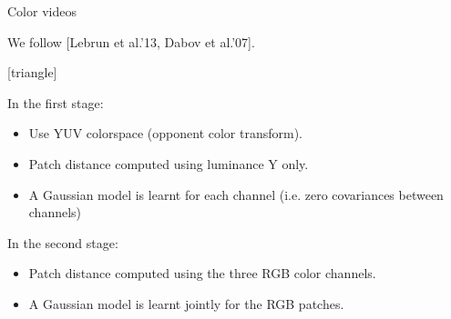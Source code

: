 \documentclass[mathserif, 8pt]{beamer}
\newcommand{\reference}[1] {{\color{gray} [#1]}}
\begin{document}
\begin{frame}{Color videos}

	We follow \reference{Lebrun et al.'13, Dabov et al.'07}.

	\bigskip

	[triangle]
	
	In the first stage: 
	\begin{itemize}\itemsep=.3cm
		\item Use YUV colorspace (opponent color transform).
		\item Patch distance computed using luminance Y only.
		\item A Gaussian model is learnt for each channel (i.e. zero covariances
			between channels)
	\end{itemize}

	\bigskip

	\bigskip

	In the second stage: 
	\begin{itemize}\itemsep=.3cm
		\item Patch distance computed using the three RGB color channels.
		\item A Gaussian model is learnt jointly for the RGB patches.
	\end{itemize}
	
\end{frame}

% 
% 
% 
% 
% 
% 
% 	
% 
\end{document}
